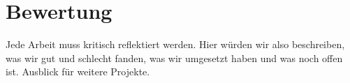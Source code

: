 \chapter{Bewertung}
Jede Arbeit muss kritisch reflektiert werden. Hier würden wir also beschreiben, was wir gut und schlecht fanden, was wir umgesetzt haben und was noch offen ist. Ausblick für weitere Projekte. 
